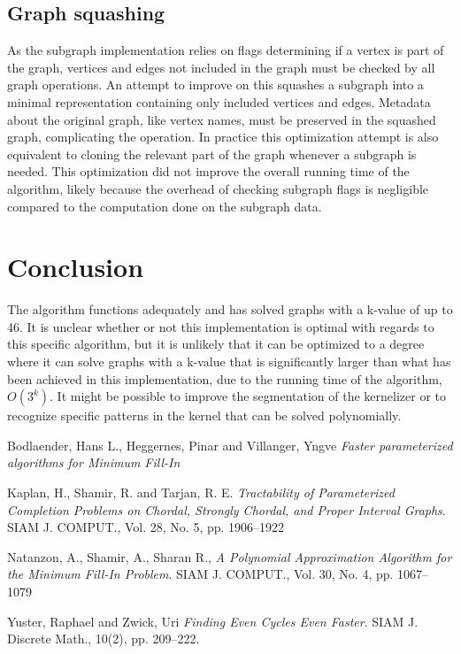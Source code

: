 \documentclass{article}
\begin{document}
		\subsection{Graph squashing}
		As the subgraph implementation relies on flags determining if a vertex is part of the graph, vertices and edges not included in the graph must be checked by all graph operations.
		An attempt to improve on this squashes a subgraph into a minimal representation containing only included vertices and edges.
		Metadata about the original graph, like vertex names, must be preserved in the squashed graph, complicating the operation.
		In practice this optimization attempt is also equivalent to cloning the relevant part of the graph whenever a subgraph is needed. This optimization did not improve the overall running time of the algorithm, likely because the overhead of checking subgraph flags is negligible compared to the computation done on the subgraph data.

	\section{Conclusion}
	The algorithm functions adequately and has solved graphs with a k-value of up to 46.
	It is unclear whether or not this implementation is optimal with regards to this specific algorithm, but it is unlikely that it can be optimized to a degree where it can solve graphs with a k-value that is significantly larger than what has been achieved in this implementation, due to the running time of the algorithm, $O(3^k)$.
	It might be possible to improve the segmentation of the kernelizer or to recognize specific patterns in the kernel that can be solved polynomially.

	\pagebreak
	
	\begin{thebibliography}{9}

		Bodlaender, Hans L., Heggernes, Pinar and Villanger, Yngve
		\textit{Faster parameterized algorithms for Minimum Fill-In}

		Kaplan, H., Shamir, R. and Tarjan, R. E. 
		\textit{Tractability of Parameterized Completion Problems on Chordal, Strongly Chordal, and Proper Interval Graphs}. 
		SIAM J. COMPUT., Vol. 28, No. 5, pp. 1906--1922

		Natanzon, A., Shamir, A., Sharan R.,
		\textit{A Polynomial Approximation Algorithm for the Minimum Fill-In Problem}. 
 		SIAM J. COMPUT., Vol. 30, No. 4, pp. 1067--1079

		Yuster, Raphael and Zwick, Uri
		\textit{Finding Even Cycles Even Faster}.
		SIAM J. Discrete Math., 10(2), pp. 209--222.		
		
	\end{thebibliography}

	\clearpage
\end{document}
